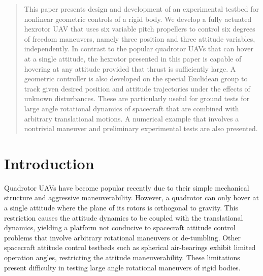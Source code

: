 \documentclass[twocolumn,letterpaper]{IEEEAerospaceCLS}  %
\begin{document}
\begin{abstract}
This paper presents design and development of an experimental testbed for nonlinear geometric controls of a rigid body. We develop a fully actuated hexrotor UAV that uses six variable pitch propellers to control six degrees of freedom maneuvers, namely three position and three attitude variables, independently. In contrast to the popular quadrotor UAVs that can hover at a single attitude, the hexrotor presented in this paper is capable of hovering at any attitude provided that thrust is sufficiently large. A geometric controller is also developed on the special Euclidean group to track given desired position and attitude trajectories under the effects of unknown disturbances. These are particularly useful for ground tests for large angle rotational dynamics of spacecraft that are combined with arbitrary translational motions. A numerical example that involves a nontrivial maneuver and preliminary experimental tests are also presented.
%
%
\end{abstract}


\tableofcontents

\section{Introduction}

Quadrotor UAVs have become popular recently due to their simple mechanical structure and aggressive maneuverability. However, a quadrotor can only hover at a single attitude where the plane of its rotors is orthogonal to gravity. This restriction causes the attitude dynamics to be coupled with the translational dynamics, yielding a platform not conducive to spacecraft attitude control problems that involve arbitrary rotational maneuvers or de-tumbling. Other spacecraft attitude control testbeds such as spherical air-bearings exhibit limited operation angles, restricting the attitude maneuverability. These limitations present difficulty in testing large angle rotational maneuvers of rigid bodies.

\end{document}
